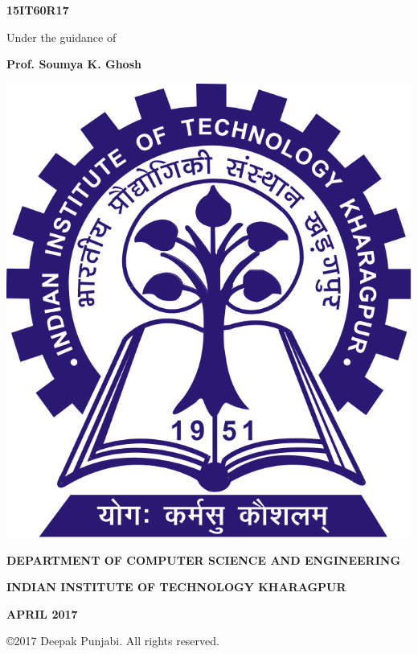  \vspace{-3em}
\begin{center}
 \large{\textbf{15IT60R17}}
\end{center}
 \vspace{-1em}
\begin{center}
 Under the guidance of
\end{center}
 \vspace{-2.5em}
\begin{center}
 \large \textbf{Prof. Soumya K. Ghosh}
\end{center}
 \vspace{0em}
\begin{center}
\includegraphics[scale=0.15]{images/logo.png}
\end{center}
 \vspace{-1em}
\begin{center}
 \textbf{\small DEPARTMENT OF COMPUTER SCIENCE AND ENGINEERING}
\end{center}
 \vspace{-3em}
\begin{center}
 \textbf{\small INDIAN INSTITUTE OF TECHNOLOGY KHARAGPUR} 
\end{center}
 \vspace{-3em}
\begin{center}
 \textbf{\small APRIL 2017}
\end{center}
 \vspace{-1em}
\begin{center}
 \copyright 2017 Deepak Punjabi. All rights reserved.
\end{center}

\clearpage
